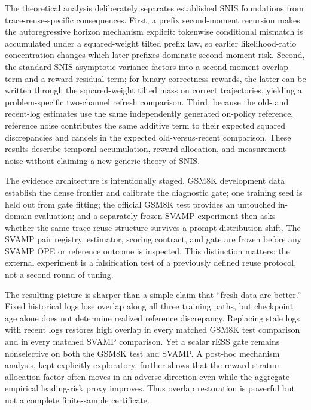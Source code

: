 \documentclass[10pt]{article}
\theoremstyle{remark}
\begin{document}
The theoretical analysis deliberately separates established SNIS foundations from trace-reuse-specific consequences. First, a prefix second-moment recursion makes the autoregressive horizon mechanism explicit: tokenwise conditional mismatch is accumulated under a squared-weight tilted prefix law, so earlier likelihood-ratio concentration changes which later prefixes dominate second-moment risk. Second, the standard SNIS asymptotic variance factors into a second-moment overlap term and a reward-residual term; for binary correctness rewards, the latter can be written through the squared-weight tilted mass on correct trajectories, yielding a problem-specific two-channel refresh comparison. Third, because the old- and recent-log estimates use the same independently generated on-policy reference, reference noise contributes the same additive term to their expected squared discrepancies and cancels in the expected old-versus-recent comparison. These results describe temporal accumulation, reward allocation, and measurement noise without claiming a new generic theory of SNIS.

The evidence architecture is intentionally staged. GSM8K development data establish the dense frontier and calibrate the diagnostic gate; one training seed is held out from gate fitting; the official GSM8K test provides an untouched in-domain evaluation; and a separately frozen SVAMP experiment then asks whether the same trace-reuse structure survives a prompt-distribution shift. The SVAMP pair registry, estimator, scoring contract, and gate are frozen before any SVAMP OPE or reference outcome is inspected. This distinction matters: the external experiment is a falsification test of a previously defined reuse protocol, not a second round of tuning.

The resulting picture is sharper than a simple claim that ``fresh data are better.'' Fixed historical logs lose overlap along all three training paths, but checkpoint age alone does not determine realized reference discrepancy. Replacing stale logs with recent logs restores high overlap in every matched GSM8K test comparison and in every matched SVAMP comparison. Yet a scalar rESS gate remains nonselective on both the GSM8K test and SVAMP. A post-hoc mechanism analysis, kept explicitly exploratory, further shows that the reward-stratum allocation factor often moves in an adverse direction even while the aggregate empirical leading-risk proxy improves. Thus overlap restoration is powerful but not a complete finite-sample certificate.
\end{document}

